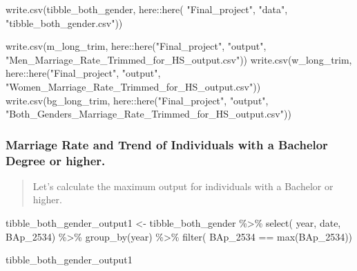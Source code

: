 \documentclass[
]{article}
\newenvironment{Shaded}{\begin{snugshade}}{\end{snugshade}}
\newcommand{\FunctionTok}[1]{\textcolor[rgb]{0.00,0.00,0.00}{#1}}
\newcommand{\NormalTok}[1]{#1}
\newcommand{\OtherTok}[1]{\textcolor[rgb]{0.56,0.35,0.01}{#1}}
\newcommand{\SpecialCharTok}[1]{\textcolor[rgb]{0.00,0.00,0.00}{#1}}
\newcommand{\StringTok}[1]{\textcolor[rgb]{0.31,0.60,0.02}{#1}}
\begin{document}
\begin{Shaded}
\begin{Highlighting}[]
\FunctionTok{write.csv}\NormalTok{(tibble\_both\_gender, }
\NormalTok{          here}\SpecialCharTok{::}\FunctionTok{here}\NormalTok{(}
            \StringTok{"Final\_project"}\NormalTok{,}
            \StringTok{"data"}\NormalTok{,}
            \StringTok{"tibble\_both\_gender.csv"}\NormalTok{))}
\end{Highlighting}
\end{Shaded}

\begin{Shaded}
\begin{Highlighting}[]
\FunctionTok{write.csv}\NormalTok{(m\_long\_trim,}
\NormalTok{          here}\SpecialCharTok{::}\FunctionTok{here}\NormalTok{(}\StringTok{"Final\_project"}\NormalTok{, }\StringTok{"output"}\NormalTok{, }\StringTok{"Men\_Marriage\_Rate\_Trimmed\_for\_HS\_output.csv"}\NormalTok{))}
\FunctionTok{write.csv}\NormalTok{(w\_long\_trim,}
\NormalTok{          here}\SpecialCharTok{::}\FunctionTok{here}\NormalTok{(}\StringTok{"Final\_project"}\NormalTok{, }\StringTok{"output"}\NormalTok{, }\StringTok{"Women\_Marriage\_Rate\_Trimmed\_for\_HS\_output.csv"}\NormalTok{))}
\FunctionTok{write.csv}\NormalTok{(bg\_long\_trim,}
\NormalTok{          here}\SpecialCharTok{::}\FunctionTok{here}\NormalTok{(}\StringTok{"Final\_project"}\NormalTok{, }\StringTok{"output"}\NormalTok{, }\StringTok{"Both\_Genders\_Marriage\_Rate\_Trimmed\_for\_HS\_output.csv"}\NormalTok{))}
\end{Highlighting}
\end{Shaded}

\hypertarget{marriage-rate-and-trend-of-individuals-with-a-bachelor-degree-or-higher.}{%
\subsubsection{Marriage Rate and Trend of Individuals with a Bachelor
Degree or
higher.}\label{marriage-rate-and-trend-of-individuals-with-a-bachelor-degree-or-higher.}}

\begin{quote}
Let's calculate the maximum output for individuals with a Bachelor or
higher.
\end{quote}

\begin{Shaded}
\begin{Highlighting}[]
\NormalTok{tibble\_both\_gender\_output1 }\OtherTok{\textless{}{-}}\NormalTok{ tibble\_both\_gender }\SpecialCharTok{\%\textgreater{}\%}
  \FunctionTok{select}\NormalTok{(}
\NormalTok{    year,}
\NormalTok{    date,}
\NormalTok{    BAp\_2534) }\SpecialCharTok{\%\textgreater{}\%} 
  \FunctionTok{group\_by}\NormalTok{(year) }\SpecialCharTok{\%\textgreater{}\%}
  \FunctionTok{filter}\NormalTok{(}
\NormalTok{    BAp\_2534 }\SpecialCharTok{==} \FunctionTok{max}\NormalTok{(BAp\_2534))}

\NormalTok{tibble\_both\_gender\_output1}
\end{Highlighting}
\end{Shaded}
\end{document}

